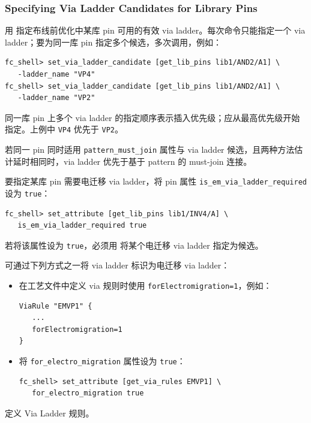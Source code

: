 \subsubsection*{Specifying Via Ladder Candidates for Library Pins}

用  指定布线前优化中某库 pin 可用的有效 via ladder。每次命令只能指定一个 via ladder；要为同一库 pin 指定多个候选，多次调用，例如：
\begin{lstlisting}
fc_shell> set_via_ladder_candidate [get_lib_pins lib1/AND2/A1] \
   -ladder_name "VP4"
fc_shell> set_via_ladder_candidate [get_lib_pins lib1/AND2/A1] \
   -ladder_name "VP2"
\end{lstlisting}

同一库 pin 上多个 via ladder 的指定顺序表示插入优先级；应从最高优先级开始指定。上例中 \texttt{VP4} 优先于 \texttt{VP2}。

\begin{noteBox}
若同一 pin 同时适用 \texttt{pattern\_must\_join} 属性与 via ladder 候选，且两种方法估计延时相同时，via ladder 优先于基于 pattern 的 must-join 连接。
\end{noteBox}

要指定某库 pin 需要电迁移 via ladder，将 pin 属性 \texttt{is\_em\_via\_ladder\_required} 设为 \texttt{true}：
\begin{lstlisting}
fc_shell> set_attribute [get_lib_pins lib1/INV4/A] \
   is_em_via_ladder_required true
\end{lstlisting}

若将该属性设为 \texttt{true}，必须用  将某个电迁移 via ladder 指定为候选。

可通过下列方式之一将 via ladder 标识为电迁移 via ladder：
\begin{itemize}
  \item 在工艺文件中定义 via 规则时使用 \texttt{forElectromigration=1}，例如：
\begin{lstlisting}
ViaRule "EMVP1" {
   ...
   forElectromigration=1
}
\end{lstlisting}
  \item 将 \texttt{for\_electro\_migration} 属性设为 \texttt{true}：
\begin{lstlisting}
fc_shell> set_attribute [get_via_rules EMVP1] \
   for_electro_migration true
\end{lstlisting}
\end{itemize}

\begin{seeAlsoBox}
定义 Via Ladder 规则。
\end{seeAlsoBox}

